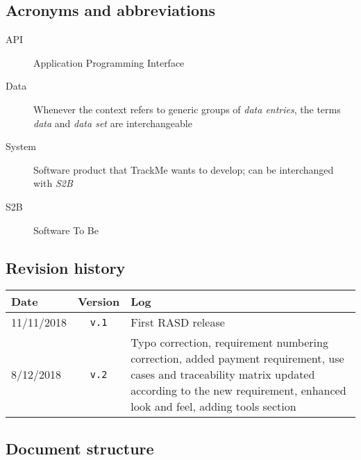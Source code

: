   \subsection{Acronyms and abbreviations}

      \begin{description}
        \item[API] Application Programming Interface
        \item[Data] Whenever the context refers to generic groups of \textit{data entries}, the terms \textit{data} and \textit{data set} are interchangeable
        \item[System] Software product that TrackMe wants to develop; can be interchanged with \textit{S2B}
        \item[S2B] Software To Be
      \end{description}

  \subsection{Revision history}

  \label{sec:revhistory}
    \begin{table}[!h]
      \begin{tabularx}{\linewidth}{|l|c|X|}
        \hline
        \textbf{Date} & \textbf{Version}                & \textbf{Log} \\ \hline
        11/11/2018 & \texttt{v.1} & First RASD release \\ \hline
        8/12/2018 & \texttt{v.2} & Typo correction, requirement numbering correction, added payment requirement, use cases and traceability matrix updated according to the new requirement, enhanced look and feel, adding tools section \\ \hline
      \end{tabularx}
    \end{table}


  \subsection{Document structure}

